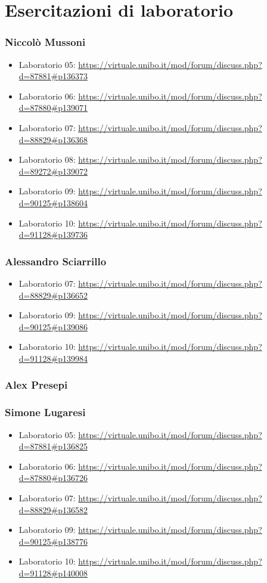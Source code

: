 \documentclass[a4paper,12pt]{report}
\begin{document}
\chapter{Esercitazioni di laboratorio}
\subsection*{Niccolò Mussoni}
\begin{itemize}
	\item Laboratorio 05: \url{https://virtuale.unibo.it/mod/forum/discuss.php?d=87881#p136373}
	\item Laboratorio 06: \url{https://virtuale.unibo.it/mod/forum/discuss.php?d=87880#p139071}
	\item Laboratorio 07: \url{https://virtuale.unibo.it/mod/forum/discuss.php?d=88829#p136368}
	\item Laboratorio 08: \url{https://virtuale.unibo.it/mod/forum/discuss.php?d=89272#p139072}
	\item Laboratorio 09: \url{https://virtuale.unibo.it/mod/forum/discuss.php?d=90125#p138604}
	\item Laboratorio 10: \url{https://virtuale.unibo.it/mod/forum/discuss.php?d=91128#p139736}
\end{itemize}

\subsection*{Alessandro Sciarrillo}
\begin{itemize}
	\item Laboratorio 07: \url{https://virtuale.unibo.it/mod/forum/discuss.php?d=88829#p136652}
	\item Laboratorio 09: \url{https://virtuale.unibo.it/mod/forum/discuss.php?d=90125#p139086}
	\item Laboratorio 10: \url{https://virtuale.unibo.it/mod/forum/discuss.php?d=91128#p139984}
\end{itemize}
\subsection*{Alex Presepi}
\subsection*{Simone Lugaresi}
\begin{itemize}
	\item Laboratorio 05: \url{https://virtuale.unibo.it/mod/forum/discuss.php?d=87881#p136825}
	\item Laboratorio 06: \url{https://virtuale.unibo.it/mod/forum/discuss.php?d=87880#p136726}
	\item Laboratorio 07: \url{https://virtuale.unibo.it/mod/forum/discuss.php?d=88829#p136582}
	\item Laboratorio 09: \url{https://virtuale.unibo.it/mod/forum/discuss.php?d=90125#p138776}
	\item Laboratorio 10: \url{https://virtuale.unibo.it/mod/forum/discuss.php?d=91128#p140008}
\end{itemize}

\tableofcontents
\end{document}
